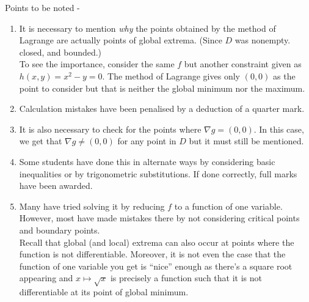 \documentclass{article}
\begin{document}
\hrulefill

\vspace{0.2 cm}

Points to be noted -
\begin{enumerate} 
	\item It is necessary to mention \emph{why} the points obtained by the method of Lagrange are actually points of global extrema. (Since $D$ was nonempty. closed, and bounded.)\\
	To see the importance, consider the same $f$ but another constraint given as $h(x, y) = x^2 - y = 0.$ The method of Lagrange gives only $(0, 0)$ as the point to consider but that is neither the global minimum nor the maximum.
	\item Calculation mistakes have been penalised by a deduction of a quarter mark.
	\item It is also necessary to check for the points where $\nabla g = (0, 0).$ In this case, we get that $\nabla g \neq (0, 0)$ for any point in $D$ but it must still be mentioned.
	\item Some students have done this in alternate ways by considering basic inequalities or by trigonometric substitutions. If done correctly, full marks have been awarded.
	\item Many have tried solving it by reducing $f$ to a function of one variable. However, most have made mistakes there by not considering critical points and boundary points.\\
	Recall that global (and local) extrema can also occur at points where the function is not differentiable. Moreover, it is not even the case that the function of one variable you get is ``nice'' enough as there's a square root appearing and $x \mapsto \sqrt{x}$ is precisely a function such that it is not differentiable at its point of global minimum.
\end{enumerate}
\end{document}
